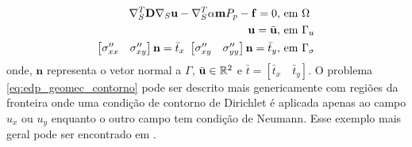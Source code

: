 \begin{equation} \label{eq:edp_geomec_contorno}
\begin{aligned}
     \nabla_S^T \mathbf{D} \nabla_S \mathbf{u} - \nabla_S^T\alpha \mathbf{m} P_p - \mathbf{f} = 0, & \text{ em }\Omega  \\
     \mathbf{u} = \bar{\mathbf{u}},& \text{ em } \Gamma_u \\
    \begin{bmatrix}
        \sigma_{xx}^{\prime\prime} & \sigma_{xy}^{\prime\prime}
    \end{bmatrix} \mathbf{n} = \bar{t}_x \text{   }     \begin{bmatrix}
        \sigma_{xy}^{\prime\prime} & \sigma_{yy}^{\prime\prime}
    \end{bmatrix} \mathbf{n} = \bar{t}_y, & \text{   em } \Gamma_{\sigma} 
\end{aligned}  
\end{equation}
onde, $\mathbf{n}$ representa o vetor normal a $\Gamma$, $\bar{\mathbf{u}} \in \mathbb{R}^2$ e $\bar{t} = [ \bar{t}_x \quad \bar{t}_y ]$. O problema \eqref{eq:edp_geomec_contorno} pode ser descrito mais genericamente com regiões da fronteira onde uma condição de contorno de Dirichlet é aplicada apenas ao campo $u_x$ ou $u_y$ enquanto o outro campo tem condição de Neumann. Esse exemplo mais geral pode ser encontrado em \citet{hughes}.
